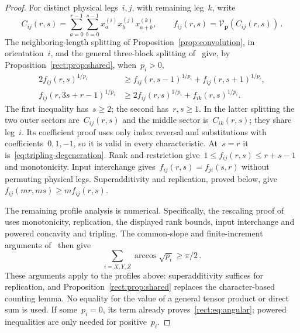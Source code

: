 \documentclass[11pt,letterpaper]{article}
\theoremstyle{definition}
\numberwithin{equation}{section}
\begin{document}
\begin{proof}
For distinct physical legs~$i,j$, with remaining leg~$k$, write
\begin{equation*}
 C_{ij}(r,s)=\sum_{a=0}^{r-1}\sum_{b=0}^{s-1}
 x_a^{(i)}x_b^{(j)}x_{a+b}^{(k)},\qquad
 f_{ij}(r,s)=\mathcal V_{\mathbf p}(C_{ij}(r,s))\,.
\end{equation*}
The neighboring-length splitting of Proposition~\ref{prop:convolution}, in orientation~$i$, and the general three-block splitting of~\cite[Lemma 2.1 and Appendices A--B]{Uznanski26} give, by Proposition~\ref{rect:prop:shared}, when~$p_i>0$,
\begin{align*}
 2f_{ij}(r,s)^{1/p_i}
 &\geq f_{ij}(r,s-1)^{1/p_i}+f_{ij}(r,s+1)^{1/p_i},\\
 f_{ij}(r,3s+r-1)^{1/p_i}
 &\geq2f_{ij}(r,s)^{1/p_i}+f_{ik}(r,s)^{1/p_i}.
\end{align*}
The first inequality has~$s\geq2$; the second has~$r,s\geq1$. In the latter splitting the two outer sectors are~$C_{ij}(r,s)$ and the middle sector is~$C_{ik}(r,s)$; they share leg~$i$. Its coefficient proof uses only index reversal and substitutions with coefficients~$0,1,-1$, so it is valid in every characteristic. At~$s=r$ it is~\eqref{eq:tripling-degeneration}. Rank and restriction give~$1\leq f_{ij}(r,s)\leq r+s-1$ and monotonicity. Input interchange gives~$f_{ij}(r,s)=f_{ji}(s,r)$ without permuting physical legs. Superadditivity and replication, proved below, give~$f_{ij}(mr,ms)\geq m f_{ij}(r,s)$.

The remaining profile analysis is numerical. Specifically, the rescaling proof of~\cite[Lemma 4.1 and Appendix F]{Uznanski26} uses monotonicity, replication, the displayed rank bounds, input interchange and powered concavity and tripling. The common-slope and finite-increment arguments of~\cite[Section 5 and Appendix G]{Uznanski26} then give
\begin{equation}\label{rect:eq:angular}
 \sum_{i=X,Y,Z}\arccos\sqrt{p_i}\geq\pi/2\,.
\end{equation}
These arguments apply to the profiles above: superadditivity suffices for replication, and Proposition~\ref{rect:prop:shared} replaces the character-based counting lemma. No equality for the value of a general tensor product or direct sum is used. If some~$p_i=0$, its term already proves~\eqref{rect:eq:angular}; powered inequalities are only needed for positive~$p_i$.


\end{proof}
\end{document}
